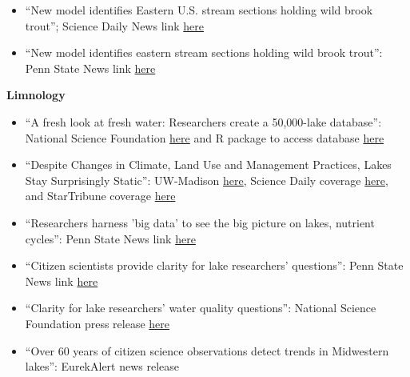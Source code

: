 \documentclass[10pt]{article}
\begin{document}
\begin{flushleft}
\begin{itemize}
\item ``New model identifies Eastern U.S. stream sections holding wild brook trout''; Science Daily News link \href{http://www.sciencedaily.com/releases/2015/01/150106154610.htm}{here}\\
\item ``New model identifies eastern stream sections holding wild brook trout'': Penn State News link
\href{http://news.psu.edu/story/339640/2015/01/06/research/new-model-identifies-eastern-stream-sections-holding-wild-brook}{here}\\
\vspace{5pt}
\end{itemize}
\textbf{Limnology}\\
\begin{itemize}
\item ``A fresh look at fresh water: Researchers create a 50,000-lake database'': National Science Foundation \href{https://www.nsf.gov/news/news_summ.jsp?cntn_id=243391&org=NSF&from=news}{here} and R package to access database \href{https://github.com/cont-limno/LAGOSNE}{here} 
\item ``Despite Changes in Climate, Land Use and Management Practices, Lakes Stay Surprisingly Static'': UW-Madison  \href{http://blog.limnology.wisc.edu/despite-changes-in-climate-land-use-and-management-practices-lakes-stay-surprisingly-static/}{here}, Science Daily coverage  \href{https://www.sciencedaily.com/releases/2017/08/170823184403.htm}{here}, and StarTribune coverage \href{http://m.startribune.com/minnesota-lakes-holding-their-own-against-pollution/441820303/?section=local}{here}
\item ``Researchers harness 'big data' to see the big picture on lakes, nutrient cycles'': Penn State News link \href{http://news.psu.edu/story/425689/2016/09/13/research/researchers-harness-big-data-see-big-picture-lakes-nutrient-cycles}{here}\\
\item ``Citizen scientists provide clarity for lake researchers' questions'': Penn State News link
\href{http://news.psu.edu/story/314178/2014/04/30/research/citizen-scientists-provide-clarity-lake-researchers-questions}{here} \\
\item ``Clarity for lake researchers' water quality questions'': National Science Foundation press release
\href{http://www.nsf.gov/discoveries/disc_summ.jsp?cntn_id=131238&org=NSF&from=news}{here} \\
\item ``Over 60 years of citizen science observations detect trends in Midwestern lakes'': EurekAlert news release

\end{itemize}
\end{flushleft}
\end{document}
